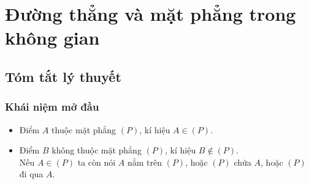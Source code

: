 \setcounter{chapter}{3}
\setcounter{section}{9}
\section{Đường thẳng và mặt phẳng trong không gian}
\subsection{Tóm tắt lý thuyết}
\subsubsection{Khái niệm mở đầu}
\begin{tcolorbox}[colback=orange!10!white]
\begin{itemize}
	\item Điểm $A$ thuộc mặt phẳng $(P)$, kí hiệu $A\in(P)$.
	\item Điểm $B$ không thuộc mặt phẳng $(P)$, kí hiệu $B\notin(P)$.\\
	Nếu $A\in(P)$ ta còn nói $A$ nằm trên $(P)$, hoặc $(P)$ chứa $A$, hoặc $(P)$ đi qua $A$.
\end{itemize}
\end{tcolorbox}
